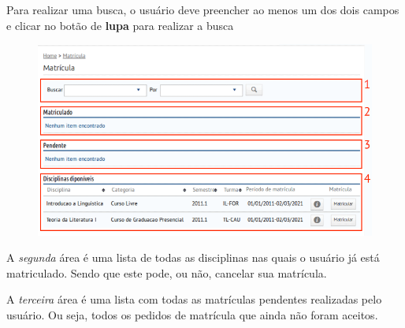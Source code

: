 \documentclass[letterpaper,10pt,english]{sphinxmanual}
\begin{document}
Para realizar uma busca, o usuário deve preencher ao menos um dos dois campos e clicar no botão de \textbf{lupa} para realizar a busca
\begin{figure}[htbp]
\centering

\includegraphics{enrollment-search.png}
\end{figure}

A \emph{segunda} área é uma lista de todas as disciplinas nas quais o usuário já está matriculado. Sendo que este pode, ou não, cancelar sua matrícula.

A \emph{terceira} área é uma lista com todas as matrículas pendentes realizadas pelo usuário. Ou seja, todos os pedidos de matrícula que ainda não foram aceitos.
\end{document}
